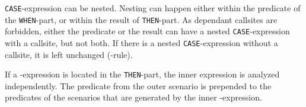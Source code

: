 \texttt{CASE}-expression can be nested. Nesting can happen either within the predicate of the \texttt{WHEN}-part, or within the result of \texttt{THEN}-part. As dependant callsites are forbidden, either the predicate or the result can have a nested \texttt{CASE}-expression with a callsite, but not both. If there is a nested \texttt{CASE}-expression without a callsite, it is left unchanged (\RBASE-rule).

If a \CASE-expression is located in the \texttt{THEN}-part, the inner expression is analyzed independently. The predicate from the outer scenario is prepended to the predicates of the scenarios that are generated by the inner \CASE-expression.

